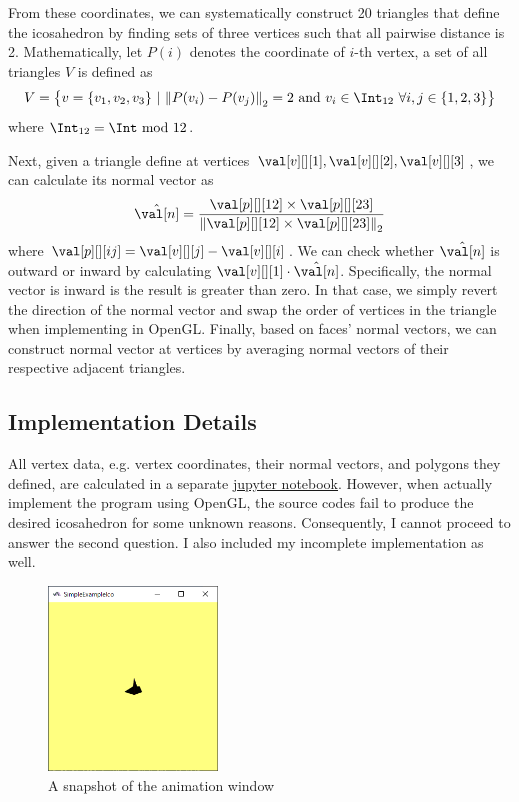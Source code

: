 From these coordinates, we can systematically construct 20 triangles that define the icosahedron by finding sets of three vertices such that all pairwise distance is 2. Mathematically, let $P(i)$ denotes the coordinate of $i$-th vertex, a set of all triangles $V$ is defined as
\begin{equation}
    V = \cbracket*{v = \{v_1, v_2, v_3\} ~|~ \norm{P(v_i) - P(v_j)}_2 = 2 \text{ and } v_i \in \Int_{12} ~\forall i,j \in \{1,2,3\}}
\end{equation}
where $\Int_{12} = \Int \text{ mod } 12$.

Next, given a triangle define at vertices $\val[v][][1], \val[v][][2], \val[v][][3]$, we can calculate its normal vector as
\begin{equation}
    \hat{\val[n]} = \frac{\val[p][][12] \times \val[p][][23]}{\norm{\val[p][][12] \times \val[p][][23]}_2}
\end{equation}
where $\val[p][][ij] = \val[v][][j] - \val[v][][i]$. We can check whether $\hat{\val[n]}$ is outward or inward by calculating $\val[v][][1] \cdot \hat{\val[n]}$. Specifically, the normal vector is inward is the result is greater than zero. In that case, we simply revert the direction of the normal vector and swap the order of vertices in the triangle when implementing in OpenGL. Finally, based on faces' normal vectors, we can construct normal vector at vertices by averaging normal vectors of their respective adjacent triangles.

\subsection{Implementation Details}

All vertex data, e.g. vertex coordinates, their normal vectors, and polygons they defined, are calculated in a separate \href{https://colab.research.google.com/drive/1Zi5pTD5Ymx8GxWOKJdblQa6rGU8Tv0q7?usp=sharing}{\underline{jupyter notebook}}. However, when actually implement the program using OpenGL, the source codes fail to produce the desired icosahedron for some unknown reasons. Consequently, I cannot proceed to answer the second question. I also included my incomplete implementation as well.

\begin{figure}[h]
    \centering
    \includegraphics[width=0.4\textwidth]{figures/assignment6/cg6-snapshot.png}
    \caption{A snapshot of the animation window}
    \label{cg6-snapshot}
\end{figure}




